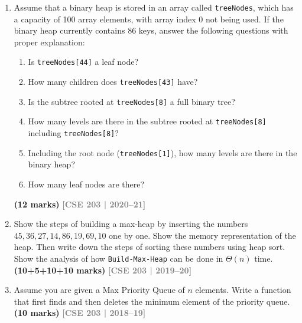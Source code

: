 \documentclass[12pt,a3paper]{article}
\newcommand{\yr}[1]{\hfill\textcolor{gray}{\small\textbf{[#1]}}}
\newcommand{\mk}[1]{\textcolor{orange!70!black}{\small\textbf{(#1 marks)}}}
\begin{document}
\begin{enumerate}
\begin{enumerate}[label=(\roman*)]
  \item Your genius little brother suggests that an equivalent strategy is
  available if we use $N_{pre}$ instead of $N_{suc}$. Do you agree with him?
  Justify your answer using the same illustrative example you showed in
  part~2.b(ii). \mk{7}
\end{enumerate}
\yr{CSE 203 | 2020--21}

\item Assume that a binary heap is stored in an array called \texttt{treeNodes},
which has a capacity of 100 array elements, with array index 0 not being used.
If the binary heap currently contains 86 keys, answer the following questions
with proper explanation:
\begin{enumerate}[label=(\roman*)]
  \item Is \texttt{treeNodes[44]} a leaf node?
  \item How many children does \texttt{treeNodes[43]} have?
  \item Is the subtree rooted at \texttt{treeNodes[8]} a full binary tree?
  \item How many levels are there in the subtree rooted at \texttt{treeNodes[8]}
  including \texttt{treeNodes[8]}?
  \item Including the root node (\texttt{treeNodes[1]}), how many levels are
  there in the binary heap?
  \item How many leaf nodes are there?
\end{enumerate}
\mk{12}
\yr{CSE 203 | 2020--21}


\item Show the steps of building a max-heap by inserting the numbers $45, 36, 27, 14, 86, 19, 69, 10$ one by one. Show the memory representation of the heap. Then write down the steps of sorting these numbers using heap sort. Show the analysis of how \texttt{Build-Max-Heap} can be done in $\Theta(n)$ time. \mk{10+5+10+10}
\yr{CSE 203 | 2019--20}

\item Assume you are given a Max Priority Queue of $n$ elements. Write a function that first finds and then deletes the minimum element of the priority queue. \mk{10}
\yr{CSE 203 | 2018--19}


\end{enumerate}
\end{document}
